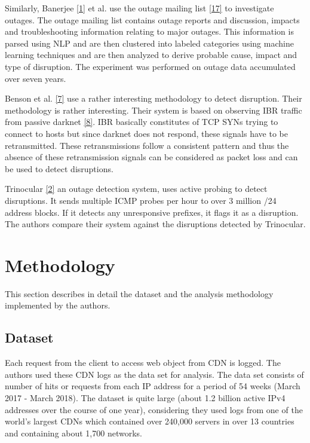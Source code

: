 \documentclass[11pt,twoside,a4paper]{article}
\begin{document}
Similarly, Banerjee \hyperlink {K1} {[1]} et al. use the outage mailing list \hyperlink{K17}{[17]} to investigate outages. The outage mailing list contains outage reports and discussion, impacts and troubleshooting information relating to major outages. This information is parsed using NLP and are then clustered into labeled categories using machine learning techniques and are then analyzed to derive probable cause, impact and type of disruption. The experiment was performed on outage data accumulated over seven years.

Benson et al. \hyperlink {K7} {[7]} use a rather interesting methodology to detect disruption. Their methodology is rather interesting. Their system is based on observing IBR traffic from passive darknet \hyperlink {K8} {[8]}. IBR basically constitutes of TCP SYNs trying to connect to hosts but since darknet does not respond, these signals have to be retransmitted. These retransmissions follow a consistent pattern and thus the absence of these retransmission signals can be considered as packet loss and can be used to detect disruptions.

Trinocular \hyperlink {K2} {[2]} an outage detection system, uses active probing to detect disruptions. It sends multiple ICMP probes per hour to over 3 million /24 address blocks. If it detects any unresponsive prefixes, it flags it as a disruption. The authors compare their system against the disruptions detected by Trinocular.

\section{Methodology}  \label{M}
This section describes in detail the dataset and the analysis methodology implemented by the authors.

\subsection{Dataset}
Each request from the client to access web object from CDN is logged. The authors used these CDN logs as the data set for analysis. The data set consists of number of hits or requests from each IP address for a period of 54 weeks (March 2017 - March 2018). The dataset is quite large (about 1.2 billion active IPv4 addresses over the course of one year),  considering they used logs from one of the world's largest CDNs which contained over 240,000 servers in over 13 countries and containing about 1,700 networks.
\end{document}
